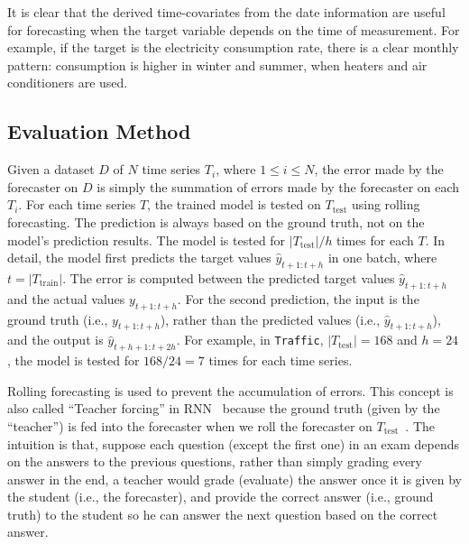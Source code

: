 It is clear that the derived time-covariates from the date information are useful for forecasting when the target variable depends on the time of measurement.
For example, if the target is the electricity consumption rate, there is a clear monthly pattern: consumption is higher in winter and summer, when heaters and air conditioners are used.

\subsection{Evaluation Method} %

Given a dataset $D$ of $N$ time series $T_i$, where $1 \leq i \leq N$, the error made by the forecaster on $D$ is simply the summation of errors made by the forecaster on each $T_i$.
%
For each time series $T$, the trained model is tested on $T_\mathrm{test}$ using rolling forecasting.
The prediction is always based on the ground truth, not on the model's prediction results.
The model is tested for $|T_\mathrm{test}|/h$ times for each $T$.
In detail, the model first predicts the target values $\hat{y}_{t+1:t+h}$ in one batch, where $t = |T_\mathrm{train}|$.
The error is computed between the predicted target values $\hat{y}_{t+1:t+h}$ and the actual values $y_{t+1:t+h}$.
For the second prediction, the input is the ground truth (i.e., $y_{t+1:t+h}$), rather than the predicted values (i.e., $\hat{y}_{t+1:t+h}$), and the output is $\hat{y}_{t+h+1:t+2h}$.
For example, in \texttt{Traffic}, $|T_\mathrm{test}| = 168$ and $h = 24$, the model is tested for $168/24 = 7$ times for each time series.

Rolling forecasting is used to prevent the accumulation of errors.
This concept is also called ``Teacher forcing'' in RNN~\cite{williams1989learning} because the ground truth (given by the ``teacher'') is fed into the forecaster when we roll the forecaster on $T_\mathrm{test}$~\cite{murphy2022probabilistic}.
The intuition is that, suppose each question (except the first one) in an exam depends on the answers to the previous questions, rather than simply grading every answer in the end, a teacher would grade (evaluate) the answer once it is given by the student (i.e., the forecaster), and provide the correct answer (i.e., ground truth) to the student so he can answer the next question based on the correct answer.


